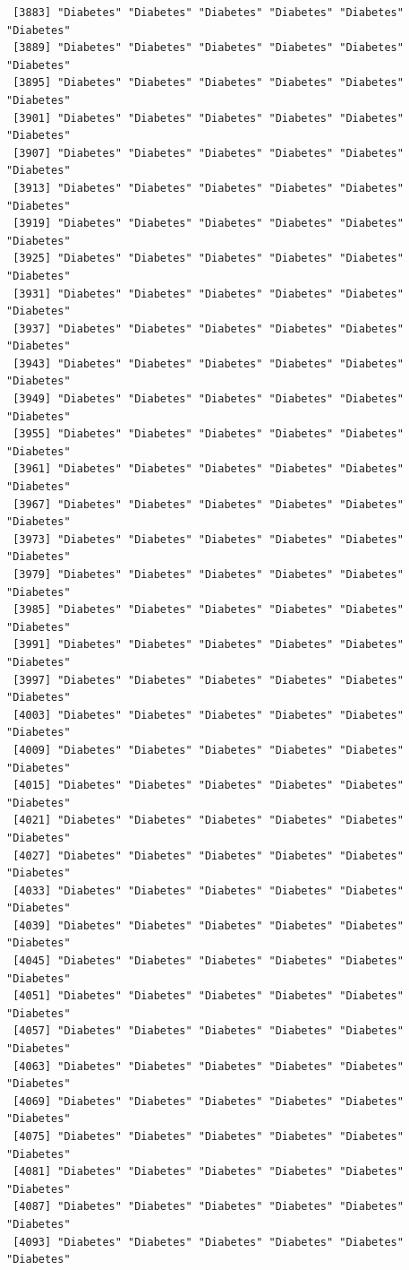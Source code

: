 \documentclass[
  letterpaper,
  DIV=11,
  numbers=noendperiod]{scrartcl}
\begin{document}
\begin{verbatim}
 [3883] "Diabetes" "Diabetes" "Diabetes" "Diabetes" "Diabetes" "Diabetes"
 [3889] "Diabetes" "Diabetes" "Diabetes" "Diabetes" "Diabetes" "Diabetes"
 [3895] "Diabetes" "Diabetes" "Diabetes" "Diabetes" "Diabetes" "Diabetes"
 [3901] "Diabetes" "Diabetes" "Diabetes" "Diabetes" "Diabetes" "Diabetes"
 [3907] "Diabetes" "Diabetes" "Diabetes" "Diabetes" "Diabetes" "Diabetes"
 [3913] "Diabetes" "Diabetes" "Diabetes" "Diabetes" "Diabetes" "Diabetes"
 [3919] "Diabetes" "Diabetes" "Diabetes" "Diabetes" "Diabetes" "Diabetes"
 [3925] "Diabetes" "Diabetes" "Diabetes" "Diabetes" "Diabetes" "Diabetes"
 [3931] "Diabetes" "Diabetes" "Diabetes" "Diabetes" "Diabetes" "Diabetes"
 [3937] "Diabetes" "Diabetes" "Diabetes" "Diabetes" "Diabetes" "Diabetes"
 [3943] "Diabetes" "Diabetes" "Diabetes" "Diabetes" "Diabetes" "Diabetes"
 [3949] "Diabetes" "Diabetes" "Diabetes" "Diabetes" "Diabetes" "Diabetes"
 [3955] "Diabetes" "Diabetes" "Diabetes" "Diabetes" "Diabetes" "Diabetes"
 [3961] "Diabetes" "Diabetes" "Diabetes" "Diabetes" "Diabetes" "Diabetes"
 [3967] "Diabetes" "Diabetes" "Diabetes" "Diabetes" "Diabetes" "Diabetes"
 [3973] "Diabetes" "Diabetes" "Diabetes" "Diabetes" "Diabetes" "Diabetes"
 [3979] "Diabetes" "Diabetes" "Diabetes" "Diabetes" "Diabetes" "Diabetes"
 [3985] "Diabetes" "Diabetes" "Diabetes" "Diabetes" "Diabetes" "Diabetes"
 [3991] "Diabetes" "Diabetes" "Diabetes" "Diabetes" "Diabetes" "Diabetes"
 [3997] "Diabetes" "Diabetes" "Diabetes" "Diabetes" "Diabetes" "Diabetes"
 [4003] "Diabetes" "Diabetes" "Diabetes" "Diabetes" "Diabetes" "Diabetes"
 [4009] "Diabetes" "Diabetes" "Diabetes" "Diabetes" "Diabetes" "Diabetes"
 [4015] "Diabetes" "Diabetes" "Diabetes" "Diabetes" "Diabetes" "Diabetes"
 [4021] "Diabetes" "Diabetes" "Diabetes" "Diabetes" "Diabetes" "Diabetes"
 [4027] "Diabetes" "Diabetes" "Diabetes" "Diabetes" "Diabetes" "Diabetes"
 [4033] "Diabetes" "Diabetes" "Diabetes" "Diabetes" "Diabetes" "Diabetes"
 [4039] "Diabetes" "Diabetes" "Diabetes" "Diabetes" "Diabetes" "Diabetes"
 [4045] "Diabetes" "Diabetes" "Diabetes" "Diabetes" "Diabetes" "Diabetes"
 [4051] "Diabetes" "Diabetes" "Diabetes" "Diabetes" "Diabetes" "Diabetes"
 [4057] "Diabetes" "Diabetes" "Diabetes" "Diabetes" "Diabetes" "Diabetes"
 [4063] "Diabetes" "Diabetes" "Diabetes" "Diabetes" "Diabetes" "Diabetes"
 [4069] "Diabetes" "Diabetes" "Diabetes" "Diabetes" "Diabetes" "Diabetes"
 [4075] "Diabetes" "Diabetes" "Diabetes" "Diabetes" "Diabetes" "Diabetes"
 [4081] "Diabetes" "Diabetes" "Diabetes" "Diabetes" "Diabetes" "Diabetes"
 [4087] "Diabetes" "Diabetes" "Diabetes" "Diabetes" "Diabetes" "Diabetes"
 [4093] "Diabetes" "Diabetes" "Diabetes" "Diabetes" "Diabetes" "Diabetes"

\end{verbatim}
\end{document}
